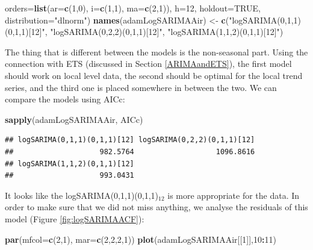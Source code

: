 \documentclass[]{book}
\newenvironment{Shaded}{\begin{snugshade}}{\end{snugshade}}
\newcommand{\DataTypeTok}[1]{\textcolor[rgb]{0.13,0.29,0.53}{#1}}
\newcommand{\DecValTok}[1]{\textcolor[rgb]{0.00,0.00,0.81}{#1}}
\newcommand{\KeywordTok}[1]{\textcolor[rgb]{0.13,0.29,0.53}{\textbf{#1}}}
\newcommand{\NormalTok}[1]{#1}
\newcommand{\OperatorTok}[1]{\textcolor[rgb]{0.81,0.36,0.00}{\textbf{#1}}}
\newcommand{\OtherTok}[1]{\textcolor[rgb]{0.56,0.35,0.01}{#1}}
\newcommand{\StringTok}[1]{\textcolor[rgb]{0.31,0.60,0.02}{#1}}
\theoremstyle{definition}
\theoremstyle{definition}
\theoremstyle{definition}
\theoremstyle{definition}
\theoremstyle{remark}
\begin{document}
\begin{Shaded}
\begin{Highlighting}[]
       \DataTypeTok{orders=}\KeywordTok{list}\NormalTok{(}\DataTypeTok{ar=}\KeywordTok{c}\NormalTok{(}\DecValTok{1}\NormalTok{,}\DecValTok{0}\NormalTok{), }\DataTypeTok{i=}\KeywordTok{c}\NormalTok{(}\DecValTok{1}\NormalTok{,}\DecValTok{1}\NormalTok{), }\DataTypeTok{ma=}\KeywordTok{c}\NormalTok{(}\DecValTok{2}\NormalTok{,}\DecValTok{1}\NormalTok{)),}
       \DataTypeTok{h=}\DecValTok{12}\NormalTok{, }\DataTypeTok{holdout=}\OtherTok{TRUE}\NormalTok{, }\DataTypeTok{distribution=}\StringTok{"dlnorm"}\NormalTok{)}
\KeywordTok{names}\NormalTok{(adamLogSARIMAAir) <-}\StringTok{ }\KeywordTok{c}\NormalTok{(}\StringTok{"logSARIMA(0,1,1)(0,1,1)[12]"}\NormalTok{,}
                             \StringTok{"logSARIMA(0,2,2)(0,1,1)[12]"}\NormalTok{,}
                             \StringTok{"logSARIMA(1,1,2)(0,1,1)[12]"}\NormalTok{)}
\end{Highlighting}
\end{Shaded}

The thing that is different between the models is the non-seasonal part. Using the connection with ETS (discussed in Section \ref{ARIMAandETS}), the first model should work on local level data, the second should be optimal for the local trend series, and the third one is placed somewhere in between the two. We can compare the models using AICc:

\begin{Shaded}
\begin{Highlighting}[]
\KeywordTok{sapply}\NormalTok{(adamLogSARIMAAir, AICc)}
\end{Highlighting}
\end{Shaded}

\begin{verbatim}
## logSARIMA(0,1,1)(0,1,1)[12] logSARIMA(0,2,2)(0,1,1)[12] 
##                    982.5764                   1096.8616 
## logSARIMA(1,1,2)(0,1,1)[12] 
##                    993.0431
\end{verbatim}

It looks like the logSARIMA(0,1,1)(0,1,1)\(_{12}\) is more appropriate for the data. In order to make sure that we did not miss anything, we analyse the residuals of this model (Figure \ref{fig:logSARIMAACF}):

\begin{Shaded}
\begin{Highlighting}[]
\KeywordTok{par}\NormalTok{(}\DataTypeTok{mfcol=}\KeywordTok{c}\NormalTok{(}\DecValTok{2}\NormalTok{,}\DecValTok{1}\NormalTok{), }\DataTypeTok{mar=}\KeywordTok{c}\NormalTok{(}\DecValTok{2}\NormalTok{,}\DecValTok{2}\NormalTok{,}\DecValTok{2}\NormalTok{,}\DecValTok{1}\NormalTok{))}
\KeywordTok{plot}\NormalTok{(adamLogSARIMAAir[[}\DecValTok{1}\NormalTok{]],}\DecValTok{10}\OperatorTok{:}\DecValTok{11}\NormalTok{)}
\end{Highlighting}
\end{Shaded}
\end{document}
